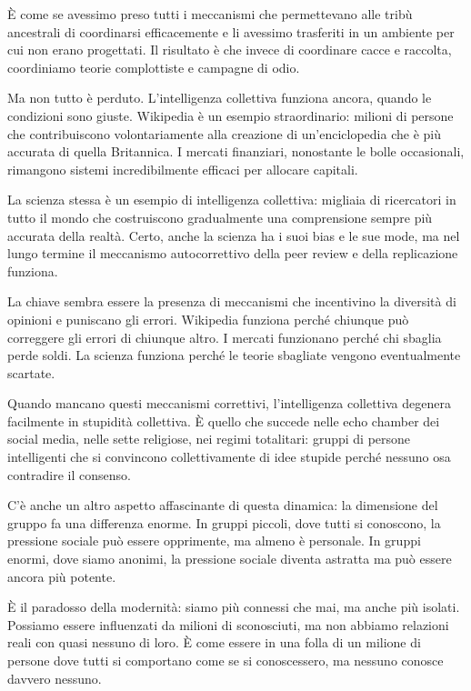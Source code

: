 È come se avessimo preso tutti i meccanismi che permettevano alle tribù ancestrali di coordinarsi efficacemente e li avessimo trasferiti in un ambiente per cui non erano progettati. Il risultato è che invece di coordinare cacce e raccolta, coordiniamo teorie complottiste e campagne di odio.

\medskip

Ma non tutto è perduto. L'intelligenza collettiva funziona ancora, quando le condizioni sono giuste. Wikipedia è un esempio straordinario: milioni di persone che contribuiscono volontariamente alla creazione di un'enciclopedia che è più accurata di quella Britannica. I mercati finanziari, nonostante le bolle occasionali, rimangono sistemi incredibilmente efficaci per allocare capitali.

La scienza stessa è un esempio di intelligenza collettiva: migliaia di ricercatori in tutto il mondo che costruiscono gradualmente una comprensione sempre più accurata della realtà. Certo, anche la scienza ha i suoi bias e le sue mode, ma nel lungo termine il meccanismo autocorrettivo della peer review e della replicazione funziona.

La chiave sembra essere la presenza di meccanismi che incentivino la diversità di opinioni e puniscano gli errori. Wikipedia funziona perché chiunque può correggere gli errori di chiunque altro. I mercati funzionano perché chi sbaglia perde soldi. La scienza funziona perché le teorie sbagliate vengono eventualmente scartate.

Quando mancano questi meccanismi correttivi, l'intelligenza collettiva degenera facilmente in stupidità collettiva. È quello che succede nelle echo chamber dei social media, nelle sette religiose, nei regimi totalitari: gruppi di persone intelligenti che si convincono collettivamente di idee stupide perché nessuno osa contradire il consenso.

\bigskip

C'è anche un altro aspetto affascinante di questa dinamica: la dimensione del gruppo fa una differenza enorme. In gruppi piccoli, dove tutti si conoscono, la pressione sociale può essere opprimente, ma almeno è personale. In gruppi enormi, dove siamo anonimi, la pressione sociale diventa astratta ma può essere ancora più potente.

È il paradosso della modernità: siamo più connessi che mai, ma anche più isolati. Possiamo essere influenzati da milioni di sconosciuti, ma non abbiamo relazioni reali con quasi nessuno di loro. È come essere in una folla di un milione di persone dove tutti si comportano come se si conoscessero, ma nessuno conosce davvero nessuno.

